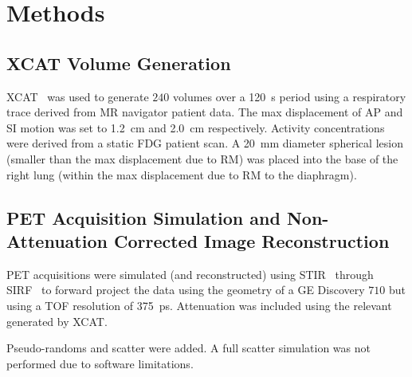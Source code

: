 \vspace{-0.3cm}

\section{Methods} \label{sec:methods}
    \subsection{XCAT Volume Generation} \label{sec:xcat_volume_generation}
        \gls{XCAT}~\cite{Segars2010} was used to generate $240$ volumes over a \SI{120}{\second} period using a respiratory trace  derived from \gls{MR} navigator patient data. The max displacement of \gls{AP} and \gls{SI} motion was set to \SI{1.2}{\centi\metre} and \SI{2.0}{\centi\metre} respectively. Activity concentrations were derived from a static \gls{FDG} patient scan. %
        A \SI{20}{\milli\metre} diameter spherical lesion (smaller than the max displacement due to \gls{RM}) was placed into the base of the right lung (within the max displacement due to \gls{RM} to the diaphragm).
    
    \vspace{-0.3cm}
    
    \subsection{PET Acquisition Simulation and Non-Attenuation Corrected Image Reconstruction} \label{sec:pet_acquisition_simulation_and_non_attenuation_corrected_image_reconstruction}
        \gls{PET} acquisitions were simulated (and reconstructed) using \gls{STIR}~\cite{Thielemans2012, Nikos2019} through \gls{SIRF}~\cite{Ovtchinnikov2017} to forward project the data using the geometry of a \gls{GE} Discovery $710$ but using a \gls{TOF} resolution of \SI{375}{\pico\second}. %
        Attenuation was included using the relevant  generated by \gls{XCAT}.
        
        Pseudo-randoms and scatter were added. %
        A full scatter simulation was not performed due to software limitations.
        
